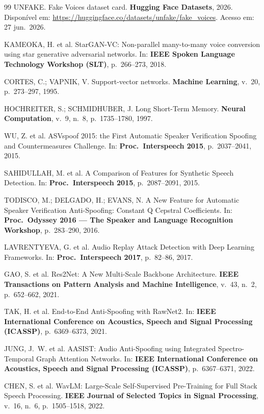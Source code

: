 \documentclass[12pt,a4paper]{article}
\begin{document}
\begin{thebibliography}{99}
UNFAKE.
Fake Voices dataset card.
\textbf{Hugging Face Datasets}, 2026.
Disponível em: \url{https://huggingface.co/datasets/unfake/fake_voices}.
Acesso em: 27 jun.\ 2026.

KAMEOKA, H. et al.
StarGAN-VC: Non-parallel many-to-many voice conversion using star generative
adversarial networks.
In: \textbf{IEEE Spoken Language Technology Workshop (SLT)},
p.~266--273, 2018.

CORTES, C.; VAPNIK, V.
Support-vector networks.
\textbf{Machine Learning},
v.~20, p.~273--297, 1995.

HOCHREITER, S.; SCHMIDHUBER, J.
Long Short-Term Memory.
\textbf{Neural Computation},
v.~9, n.~8, p.~1735--1780, 1997.

WU, Z. et al.
ASVspoof 2015: the First Automatic Speaker Verification Spoofing and
Countermeasures Challenge.
In: \textbf{Proc.\ Interspeech 2015}, p.~2037--2041, 2015.

SAHIDULLAH, M. et al.
A Comparison of Features for Synthetic Speech Detection.
In: \textbf{Proc.\ Interspeech 2015}, p.~2087--2091, 2015.

TODISCO, M.; DELGADO, H.; EVANS, N.
A New Feature for Automatic Speaker Verification Anti-Spoofing:
Constant Q Cepstral Coefficients.
In: \textbf{Proc.\ Odyssey 2016 --- The Speaker and Language Recognition
Workshop}, p.~283--290, 2016.

LAVRENTYEVA, G. et al.
Audio Replay Attack Detection with Deep Learning Frameworks.
In: \textbf{Proc.\ Interspeech 2017}, p.~82--86, 2017.

GAO, S. et al.
Res2Net: A New Multi-Scale Backbone Architecture.
\textbf{IEEE Transactions on Pattern Analysis and Machine Intelligence},
v.~43, n.~2, p.~652--662, 2021.

TAK, H. et al.
End-to-End Anti-Spoofing with RawNet2.
In: \textbf{IEEE International Conference on Acoustics, Speech and Signal
Processing (ICASSP)}, p.~6369--6373, 2021.

JUNG, J.~W. et al.
AASIST: Audio Anti-Spoofing using Integrated Spectro-Temporal Graph Attention
Networks.
In: \textbf{IEEE International Conference on Acoustics, Speech and Signal
Processing (ICASSP)}, p.~6367--6371, 2022.

CHEN, S. et al.
WavLM: Large-Scale Self-Supervised Pre-Training for Full Stack Speech
Processing.
\textbf{IEEE Journal of Selected Topics in Signal Processing},
v.~16, n.~6, p.~1505--1518, 2022.


\end{thebibliography}
\end{document}
